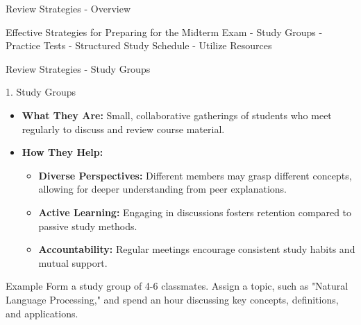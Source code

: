 \documentclass[aspectratio=169]{beamer}
\begin{document}
\begin{frame}[fragile]{Review Strategies - Overview}
    \begin{block}{Effective Strategies for Preparing for the Midterm Exam}
        - Study Groups
        - Practice Tests
        - Structured Study Schedule
        - Utilize Resources
    \end{block}
\end{frame}

\begin{frame}[fragile]{Review Strategies - Study Groups}
    \begin{block}{1. Study Groups}
        \begin{itemize}
            \item \textbf{What They Are:} Small, collaborative gatherings of students who meet regularly to discuss and review course material.
            \item \textbf{How They Help:}
            \begin{itemize}
                \item \textbf{Diverse Perspectives:} Different members may grasp different concepts, allowing for deeper understanding from peer explanations.
                \item \textbf{Active Learning:} Engaging in discussions fosters retention compared to passive study methods.
                \item \textbf{Accountability:} Regular meetings encourage consistent study habits and mutual support.
            \end{itemize}
        \end{itemize}
    \end{block}
    \begin{block}{Example}
        Form a study group of 4-6 classmates. Assign a topic, such as "Natural Language Processing," and spend an hour discussing key concepts, definitions, and applications.
    \end{block}
\end{frame}
\end{document}

